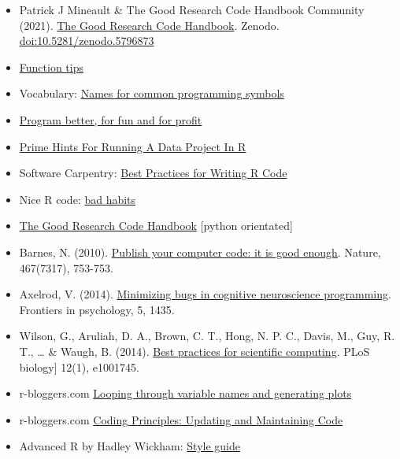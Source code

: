 \documentclass[
]{book}
\providecommand{\tightlist}{%
  \setlength{\itemsep}{0pt}\setlength{\parskip}{0pt}}
\begin{document}
\begin{itemize}
\tightlist
\item
  Patrick J Mineault \& The Good Research Code Handbook Community (2021). \href{https://goodresearch.dev/}{The Good Research Code Handbook}. Zenodo. \url{doi:10.5281/zenodo.5796873}
\item
  \href{https://debruine.github.io/posts/function-tips/}{Function tips}
\item
  Vocabulary: \href{https://psyteachr.github.io/msc-data-skills/symbols.html}{Names for common programming symbols}
\item
  \href{https://inattentionalcoffee.wordpress.com/2017/01/13/program-better-for-fun-and-for-profit/}{Program better, for fun and for profit}
\item
  \href{https://kkulma.github.io/2018-03-18-Prime-Hints-for-Running-a-data-project-in-R/}{Prime Hints For Running A Data Project In R}
\item
  Software Carpentry: \href{https://swcarpentry.github.io/r-novice-inflammation/06-best-practices-R/}{Best Practices for Writing R Code}
\item
  Nice R code: \href{https://nicercode.github.io/intro/bad-habits.html}{bad habits}
\item
  \href{https://goodresearch.dev/}{The Good Research Code Handbook} {[}python orientated{]}
\item
  Barnes, N. (2010). \href{https://www.nature.com/articles/467753a}{Publish your computer code: it is good enough}. Nature, 467(7317), 753-753.
\item
  Axelrod, V. (2014). \href{https://www.frontiersin.org/articles/10.3389/fpsyg.2014.01435/full}{Minimizing bugs in cognitive neuroscience programming}. Frontiers in psychology, 5, 1435.
\item
  Wilson, G., Aruliah, D. A., Brown, C. T., Hong, N. P. C., Davis, M., Guy, R. T., \ldots{} \& Waugh, B. (2014). \href{http://journals.plos.org/plosbiology/article?id=10.1371/journal.pbio.1001745}{Best practices for scientific computing}. PLoS biology{]} 12(1), e1001745.
\item
  r-bloggers.com \href{https://www.r-bloggers.com/2021/05/little-useless-useful-r-functions-looping-through-variable-names-and-generating-plots/}{Looping through variable names and generating plots}
\item
  r-bloggers.com \href{https://www.r-bloggers.com/2021/02/coding-principles-updating-and-maintaining-code/}{Coding Principles: Updating and Maintaining Code}
\item
  Advanced R by Hadley Wickham: \href{http://adv-r.had.co.nz/Style.html}{Style guide}
\end{itemize}
\end{document}
